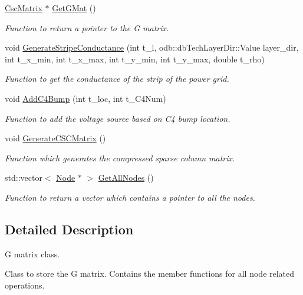 \begin{DoxyCompactItemize}
\hyperlink{structCscMatrix}{Csc\+Matrix} $\ast$ \hyperlink{classGMat_a907a945858399a70cc5b77952b81d25a}{Get\+G\+Mat} ()
\begin{DoxyCompactList}\small\item\em Function to return a pointer to the G matrix. \end{DoxyCompactList}\item 
void \hyperlink{classGMat_a0d8697945b060deaaf4bbd3a444aab6f}{Generate\+Stripe\+Conductance} (int t\+\_\+l, odb\+::db\+Tech\+Layer\+Dir\+::\+Value layer\+\_\+dir, int t\+\_\+x\+\_\+min, int t\+\_\+x\+\_\+max, int t\+\_\+y\+\_\+min, int t\+\_\+y\+\_\+max, double t\+\_\+rho)
\begin{DoxyCompactList}\small\item\em Function to get the conductance of the strip of the power grid. \end{DoxyCompactList}\item 
void \hyperlink{classGMat_a21ee1650f436e769255235d3b2fe8aa8}{Add\+C4\+Bump} (int t\+\_\+loc, int t\+\_\+\+C4\+Num)
\begin{DoxyCompactList}\small\item\em Function to add the voltage source based on C4 bump location. \end{DoxyCompactList}\item 
void \hyperlink{classGMat_acc6b68783732ff34b6dd4098cb738836}{Generate\+C\+S\+C\+Matrix} ()
\begin{DoxyCompactList}\small\item\em Function which generates the compressed sparse column matrix. \end{DoxyCompactList}\item 
std\+::vector$<$ \hyperlink{classNode}{Node} $\ast$ $>$ \hyperlink{classGMat_a9bc88ff1d3a55795024e814de8c69617}{Get\+All\+Nodes} ()
\begin{DoxyCompactList}\small\item\em Function to return a vector which contains a pointer to all the nodes. \end{DoxyCompactList}\end{DoxyCompactItemize}


\subsection{Detailed Description}
G matrix class. 

Class to store the G matrix. Contains the member functions for all node related operations. 

